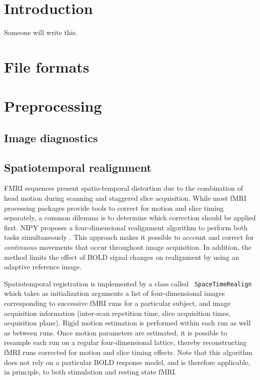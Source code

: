 \documentclass{bioinfo}
\begin{document}
\section{Introduction}

Someone will write this.

\section{File formats}

\section{Preprocessing}

\subsection{Image diagnostics}

\subsection{Spatiotemporal realignment}

FMRI sequences present spatio-temporal distortion due to the
combination of head motion during scanning and staggered slice
acquisition. While most fMRI processing packages provide tools to
correct for motion and slice timing separately, a common dilemma is to
determine which correction should be applied first. NIPY proposes a
four-dimensional realignment algorithm to perform both tasks
simultaneously \citep{roche:tmi:11}. This approach makes it possible
to account and correct for {\em continuous} movements that occur
throughout image acquisition. In addition, the method limits the
effect of BOLD signal changes on realignment \citep{freire:ni:01} by
using an adaptive reference image.

Spatiotemporal registration is implemented by a class called {\tt
  SpaceTimeRealign} which takes as initialization arguments a list of
four-dimensional images corresponding to successive fMRI runs for a
particular subject, and image acquisition information (inter-scan
repetition time, slice acquisition times, acquisition plane). Rigid
motion estimation is performed within each run as well as between
runs. Once motion parameters are estimated, it is possible to resample
each run on a regular four-dimensional lattice, thereby reconstructing
fMRI runs corrected for motion and slice timing effects. Note that
this algorithm does not rely on a particular BOLD response model, and
is therefore applicable, in principle, to both stimulation and resting
state fMRI.
\end{document}
